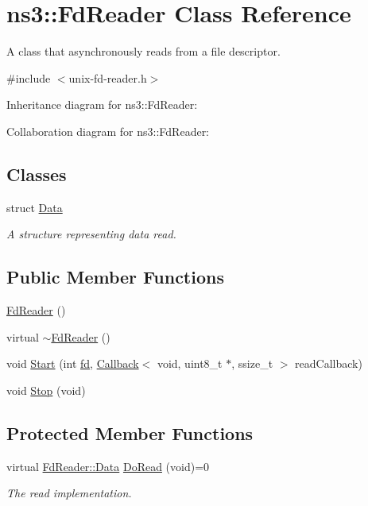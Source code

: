 \hypertarget{classns3_1_1FdReader}{}\section{ns3\+:\+:Fd\+Reader Class Reference}
\label{classns3_1_1FdReader}


A class that asynchronously reads from a file descriptor.  




{\ttfamily \#include $<$unix-\/fd-\/reader.\+h$>$}



Inheritance diagram for ns3\+:\+:Fd\+Reader\+:


Collaboration diagram for ns3\+:\+:Fd\+Reader\+:
\subsection*{Classes}
\begin{DoxyCompactItemize}
\item 
struct \hyperlink{structns3_1_1FdReader_1_1Data}{Data}
\begin{DoxyCompactList}\small\item\em A structure representing data read. \end{DoxyCompactList}\end{DoxyCompactItemize}
\subsection*{Public Member Functions}
\begin{DoxyCompactItemize}
\item 
\hyperlink{classns3_1_1FdReader_a1c1ba5297d4015304350f909e3d658f3}{Fd\+Reader} ()
\item 
virtual \hyperlink{classns3_1_1FdReader_ae69d0181118f371221ac3c339004314b}{$\sim$\+Fd\+Reader} ()
\item 
void \hyperlink{classns3_1_1FdReader_aad8139555df8e9fd58e819f19547a42d}{Start} (int \hyperlink{mmwave_2model_2fading-traces_2fading__trace__generator_8m_a44f21d5190b5a6df8089f54799628d7e}{fd}, \hyperlink{classns3_1_1Callback}{Callback}$<$ void, uint8\+\_\+t $\ast$, ssize\+\_\+t $>$ read\+Callback)
\item 
void \hyperlink{classns3_1_1FdReader_a0d30fe465fc06dc41a66a439e84f61b6}{Stop} (void)
\end{DoxyCompactItemize}
\subsection*{Protected Member Functions}
\begin{DoxyCompactItemize}
\item 
virtual \hyperlink{structns3_1_1FdReader_1_1Data}{Fd\+Reader\+::\+Data} \hyperlink{classns3_1_1FdReader_a5d622d726859828ba7bc557b57689b1b}{Do\+Read} (void)=0
\begin{DoxyCompactList}\small\item\em The read implementation. \end{DoxyCompactList}\end{DoxyCompactItemize}

